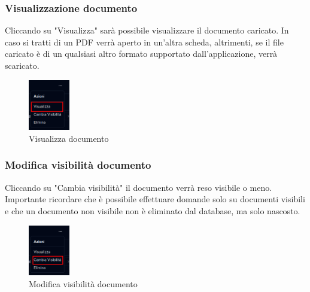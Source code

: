 \subsubsection{Visualizzazione documento}
Cliccando su "Visualizza" sarà possibile visualizzare il documento caricato. In caso si tratti di un PDF verrà aperto in un'altra scheda, altrimenti, se il file caricato è di un qualsiasi altro formato supportato dall'applicazione, verrà scaricato.  
\begin{figure}[h!]
    \centering
    \includegraphics[width=0.16\textwidth]{menuactiondocvisualizza.png}
    \caption{Visualizza documento}\label{fig:seedocs}
\end{figure}
\subsubsection{Modifica visibilità documento}
Cliccando su "Cambia visibilità" il documento verrà reso visibile o meno. Importante ricordare che è possibile effettuare domande solo su documenti visibili e che un documento non visibile non è eliminato dal database, ma solo nascosto.
\begin{figure}[h!]
    \centering
    \includegraphics[width=0.16\textwidth]{menuactiondocvisibility.png}
    \caption{Modifica visibilità documento}\label{fig:visibilitydocs}
\end{figure}
